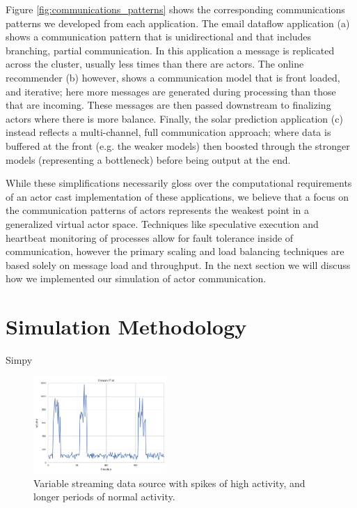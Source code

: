\documentclass[conference,twocolumn,10pt]{IEEEtran}
\begin{document}
Figure \ref{fig:communications_patterns} shows the corresponding communications patterns we developed from each application. The email dataflow application (a) shows a communication pattern that is unidirectional and that includes branching, partial communication. In this application a message is replicated across the cluster, usually less times than there are actors. The online recommender (b) however, shows a communication model that is front loaded, and iterative; here more messages are generated during processing than those that are incoming. These messages are then passed downstream to finalizing actors where there is more balance. Finally, the solar prediction application (c) instead reflects a multi-channel, full communication approach; where data is buffered at the front (e.g. the weaker models) then boosted through the stronger models (representing a bottleneck) before being output at the end.

While these simplifications necessarily gloss over the computational requirements of an actor cast implementation of these applications, we believe that a focus on the communication patterns of actors represents the weakest point in a generalized virtual actor space. Techniques like speculative execution and heartbeat monitoring of processes allow for fault tolerance inside of communication, however the primary scaling and load balancing techniques are based solely on message load and throughput. In the next section we will discuss how we implemented our simulation of actor communication.

\section{Simulation Methodology}

Simpy \cite{matloff_introduction_2008}

\begin{figure}[!h]
    \centering
    \includegraphics[width=0.45\textwidth]{streaming}
    \caption{Variable streaming data source with spikes of high activity, and longer periods of normal activity.}
    \label{fig:streaming}
\end{figure}
\end{document}
